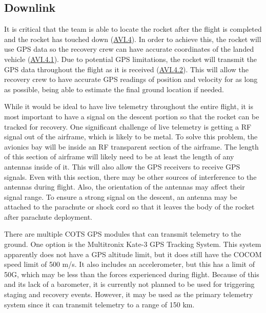 \subsection{Downlink}
It is critical that the team is able to locate the rocket after the flight is completed and the rocket has touched down (\hyperlink{AVI.4}{AVI.4}). In order to achieve this, the rocket will use GPS data so the recovery crew can have accurate coordinates of the landed vehicle (\hyperlink{AVI.4.1}{AVI.4.1}). Due to potential GPS limitations, the rocket will transmit the GPS data throughout the flight as it is received (\hyperlink{AVI.4.2}{AVI.4.2}). This will allow the recovery crew to have accurate GPS readings of position and velocity for as long as possible, being able to estimate the final ground location if needed.

While it would be ideal to have live telemetry throughout the entire flight, it is most important to have a signal on the descent portion so that the rocket can be tracked for recovery. One significant challenge of live telemetry is getting a RF signal out of the airframe, which is likely to be metal. To solve this problem, the avionics bay will be inside an RF transparent section of the airframe. The length of this section of airframe will likely need to be at least the length of any antennas inside of it. This will also allow the GPS receivers to receive GPS signals. Even with this section, there may be other sources of interference to the antennas during flight. Also, the orientation of the antennas may affect their signal range. To ensure a strong signal on the descent, an antenna may be attached to the parachute or shock cord so that it leaves the body of the rocket after parachute deployment.

There are multiple COTS GPS modules that can transmit telemetry to the ground. One option is the Multitronix Kate-3 GPS Tracking System. This system apparently does not have a GPS altitude limit, but it does still have the COCOM speed limit of 500 m/s. It also includes an accelerometer, but this has a limit of 50G, which may be less than the forces experienced during flight. Because of this and its lack of a barometer, it is currently not planned to be used for triggering staging and recovery events. However, it may be used as the primary telemetry system since it can transmit telemetry to a range of 150 km.

